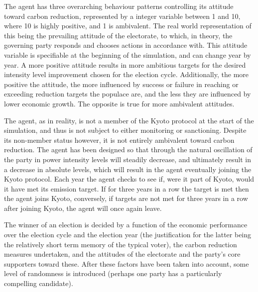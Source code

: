 The agent has three overarching behaviour patterns controlling its attitude toward carbon reduction, represented by a integer variable between 1 and 10, where 10 is highly positive, and 1 is ambivalent. The real world representation of this being the prevailing attitude of the electorate, to which, in theory, the governing party responds and chooses actions in accordance with. This attitude variable is specifiable at the beginning of the simulation, and can change year by year. A more positive attitude results in more ambitious targets for the desired intensity level improvement chosen for the election cycle. Additionally, the more positive the attitude, the more influenced by success or failure in reaching or exceeding reduction targets the populace are, and the less they are influenced by lower economic growth. The opposite is true for more ambivalent attitudes.

The agent, as in reality, is not a member of the Kyoto protocol at the start of the simulation, and thus is not subject to either monitoring or sanctioning. Despite its non-member status however, it is not entirely ambivalent toward carbon reduction. The agent has been designed so that through the natural oscillation of the party in power intensity levels will steadily decrease, and ultimately result in a decrease in absolute levels, which will result in the agent eventually joining the Kyoto protocol. Each year the agent checks to see if, were it part of Kyoto, would it have met its emission target. If for three years in a row the target is met then the agent joins Kyoto, conversely, if targets are not met for three years in a row after joining Kyoto, the agent will once again leave.

The winner of an election is decided by a function of the economic performance over the election cycle and the election year (the justification for the latter being the relatively short term memory of the typical voter), the carbon reduction measures undertaken, and the attitudes of the electorate and the party's core supporters toward these. After these factors have been taken into account, some level of randomness is introduced (perhaps one party has a particularly compelling candidate).

